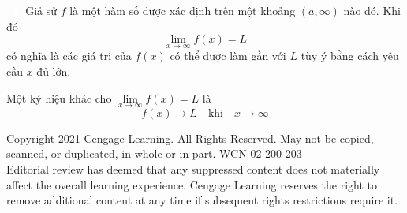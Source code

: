 \begin{minipage}[t]{134mm}
  \begin{tcolorbox}[
    colframe=stewartred,
    colback=white,
    boxrule=0.8pt,
    arc=0pt,
    left=8pt, right=8pt, top=6pt, bottom=7pt
  ]
  \noindent
  \colorbox{stewartred}{\textcolor{white}{\bfseries\fontsize{9}{11}\selectfont\ 1\ }}\hspace{0.5em}{\bfseries\textcolor{stewartred}{Định nghĩa trực quan về Giới hạn tại Vô cực}}\hspace{0.8em}Giả sử $f$ là một hàm số được xác định trên một khoảng $(a, \infty)$ nào đó. Khi đó
  \[
  \lim_{x \to \infty} f(x) = L
  \]
  có nghĩa là các giá trị của $f(x)$ có thể được làm gần với $L$ tùy ý bằng cách yêu cầu $x$ đủ lớn.
  \end{tcolorbox}
  \vspace{0.4em}

  \noindent
  Một ký hiệu khác cho $\lim\limits_{x \to \infty} f(x) = L$ là
  \[
  f(x) \to L \quad \text{khi} \quad x \to \infty
  \]
\end{minipage}

\vfill
\begin{center}
{\fontsize{6.5}{8}\selectfont\color{black!70}
Copyright 2021 Cengage Learning. All Rights Reserved. May not be copied, scanned, or duplicated, in whole or in part. WCN 02-200-203\\[1.5pt]
Editorial review has deemed that any suppressed content does not materially affect the overall learning experience. Cengage Learning reserves the right to remove additional content at any time if subsequent rights restrictions require it.
}
\end{center}

